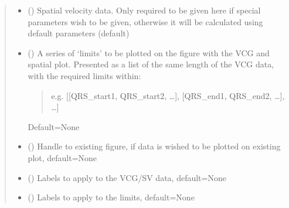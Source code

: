 \documentclass[letterpaper,10pt,english]{sphinxmanual}
\begin{document}
\begin{fulllineitems}
\begin{quote}
\begin{description}
\begin{itemize}
\item {} 
\sphinxAtStartPar
{} (\sphinxstyleliteralemphasis{\sphinxupquote{, }}) \textendash{} Spatial velocity data. Only required to be given here if special parameters wish to be given, otherwise it
will be calculated using default parameters (default)

\item {} 
\sphinxAtStartPar
{} (\sphinxstyleliteralemphasis{\sphinxupquote{, }}) \textendash{} 
\sphinxAtStartPar
A series of ‘limits’ to be plotted on the figure with the VCG and spatial plot. Presented as a list of the
same length of the VCG data, with the required limits within:
\begin{quote}

\sphinxAtStartPar
e.g. {[}{[}QRS\_start1, QRS\_start2, …{]}, {[}QRS\_end1, QRS\_end2, …{]}, …{]}
\end{quote}

\sphinxAtStartPar
Default=None


\item {} 
\sphinxAtStartPar
{} (\sphinxstyleliteralemphasis{\sphinxupquote{, }}) \textendash{} Handle to existing figure, if data is wished to be plotted on existing plot, default=None

\item {} 
\sphinxAtStartPar
{} (\sphinxstyleliteralemphasis{\sphinxupquote{, }}) \textendash{} Labels to apply to the VCG/SV data, default=None

\item {} 
\sphinxAtStartPar
{} (\sphinxstyleliteralemphasis{\sphinxupquote{, }}) \textendash{} Labels to apply to the limits, default=None


\end{itemize}
\end{description}
\end{quote}
\end{fulllineitems}
\end{document}
